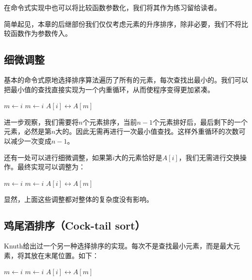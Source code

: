 \documentclass{ctexart}
\begin{document}
在命令式实现中也可以将比较函数参数化，我们将其作为练习留给读者。

简单起见，本章的后继部份我们仅仅考虑元素的升序排序，除非必要，我们不将比较函数作为参数传入。

\subsection{细微调整}

基本的命令式原地选择排序算法遍历了所有的元素，每次查找出最小的。我们可以把最小值的查找直接实现为一个内重循环，从而使程序变得更加紧凑。

\begin{algorithmic}[1]
    \State $m \gets i$
        \State $m \gets i$
      \EndIf
    \EndFor
    \State {} $A[i] \leftrightarrow A[m]$
  \EndFor
\EndProcedure
\end{algorithmic}

进一步观察，我们需要将$n$个元素排序，当前$n-1$个元素排好后，最后剩下的一个元素，必然是第$n$大的。因此无需再进行一次最小值查找。这样外重循环的次数可以减少一次变成$n-1$。

还有一处可以进行细微调整，如果第$i$大的元素恰好是$A[i]$，我们无需进行交换操作。最终实现可以调整为：

\begin{algorithmic}[1]
    \State $m \gets i$
        \State $m \gets i$
      \EndIf
    \EndFor
      \State {} $A[i] \leftrightarrow A[m]$
    \EndIf
  \EndFor
\EndProcedure
\end{algorithmic}

显然，上面这些调整都对整体的复杂度没有影响。

\subsection{鸡尾酒排序（Cock-tail sort）}

Knuth给出过一个另一种选择排序的实现\cite{TAOCP}。每次不是查找最小元素，而是最大元素，将其放在末尾位置。如下：

\begin{algorithmic}[1]
    \State $m \gets i$
        \State $m \gets i$
      \EndIf
    \EndFor
    \State {} $A[i] \leftrightarrow A[m]$
  \EndFor
\EndProcedure
\end{algorithmic}
\end{document}
